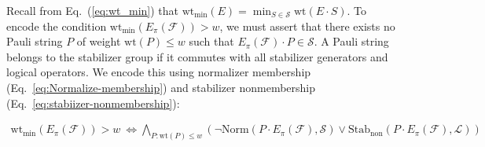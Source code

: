 \documentclass[acmsmall,screen,review,anonymous,nonacm]{acmart}
\begin{document}
Recall from Eq.~(\ref{eq:wt_min}) that 
$ \mathrm{wt}_{\min}(E) = \min_{S\in\mathcal{S}}\mathrm{wt}(E\cdot S). $ 
To encode the condition $\mathrm{wt}_{\min}(E_\pi(\mathcal{F})) > w$, we must assert that there exists no Pauli string $P$ of weight $\mathrm{wt}(P) \leq w$ such that $E_\pi(\mathcal{F})\cdot P \in \mathcal{S}$. A Pauli string belongs to the stabilizer group if it commutes with all stabilizer generators and logical operators. We encode this using normalizer membership (Eq.~\ref{eq:Normalize-membership}) and stabilizer nonmembership (Eq.~\ref{eq:stabiizer-nonmembership}):

\begin{equation} \label{eq:minimum-weight}
    \begin{aligned}
      \mathrm{wt}_{\min}(E_\pi(\mathcal{F}))>w \ \Longleftrightarrow \bigwedge_{P : \mathrm{wt}(P) \leq w} \left(\neg\mathrm{Norm}(P \cdot E_\pi(\mathcal{F}), \mathcal{S}) \lor \mathrm{Stab}_{\mathrm{non}}(P \cdot E_\pi(\mathcal{F}), \mathcal{L})\right)
    \end{aligned}
\end{equation}






\end{document}
